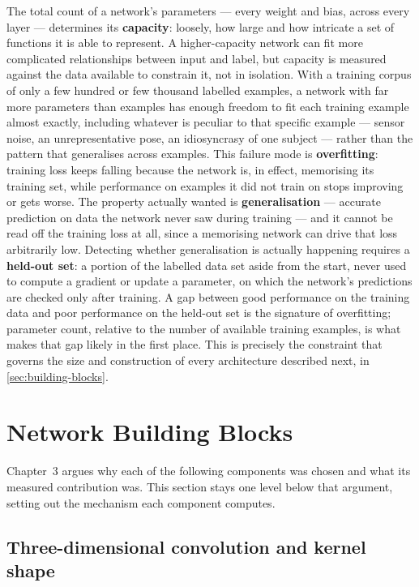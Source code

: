The total count of a network's parameters --- every weight and bias, across every layer --- determines its \textbf{capacity}: loosely, how large and how intricate a set of functions it is able to represent. A higher-capacity network can fit more complicated relationships between input and label, but capacity is measured against the data available to constrain it, not in isolation. With a training corpus of only a few hundred or few thousand labelled examples, a network with far more parameters than examples has enough freedom to fit each training example almost exactly, including whatever is peculiar to that specific example --- sensor noise, an unrepresentative pose, an idiosyncrasy of one subject --- rather than the pattern that generalises across examples. This failure mode is \textbf{overfitting}: training loss keeps falling because the network is, in effect, memorising its training set, while performance on examples it did not train on stops improving or gets worse. The property actually wanted is \textbf{generalisation} --- accurate prediction on data the network never saw during training --- and it cannot be read off the training loss at all, since a memorising network can drive that loss arbitrarily low. Detecting whether generalisation is actually happening requires a \textbf{held-out set}: a portion of the labelled data set aside from the start, never used to compute a gradient or update a parameter, on which the network's predictions are checked only after training. A gap between good performance on the training data and poor performance on the held-out set is the signature of overfitting; parameter count, relative to the number of available training examples, is what makes that gap likely in the first place. This is precisely the constraint that governs the size and construction of every architecture described next, in \autoref{sec:building-blocks}.


\section{Network Building Blocks}
\label{sec:building-blocks}

Chapter~3 argues why each of the following components was chosen and what its measured contribution was. This section stays one level below that argument, setting out the mechanism each component computes.

\subsection{Three-dimensional convolution and kernel shape}
\label{sec:conv3d}

